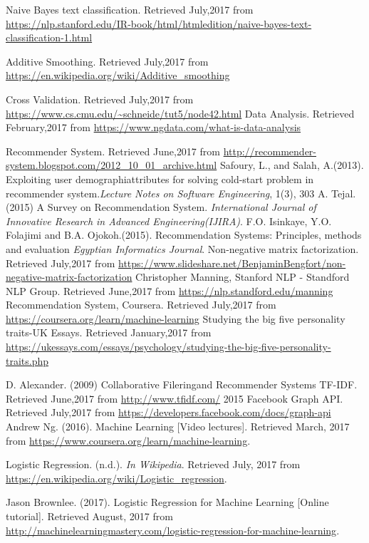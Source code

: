 \begin{thebibliography}{9}
	Naive Bayes text classification. Retrieved July,2017 from \url{https://nlp.stanford.edu/IR-book/html/htmledition/naive-bayes-text-classification-1.html}

	Additive Smoothing. Retrieved July,2017 from \url{https://en.wikipedia.org/wiki/Additive_smoothing}

Cross Validation. Retrieved July,2017 from \url{https://www.cs.cmu.edu/~schneide/tut5/node42.html}
Data Analysis. Retrieved February,2017 from \url{https://www.ngdata.com/what-is-data-analysis}

 Recommender System. Retrieved June,2017 from \url{http://recommender-system.blogspot.com/2012_10_01_archive.html}
	 Safoury, L., and Salah, A.(2013). Exploiting user demographiattributes for solving cold-start problem in recommender system.\textit{Lecture Notes on Software Engineering}, 1(3), 303
	A. Tejal.(2015) A Survey on Recommendation System. \textit{International Journal of Innovative Research in Advanced Engineering(IJIRA)}.
	F.O. Isinkaye, Y.O. Folajimi and B.A. Ojokoh.(2015). Recommendation Systems: Principles, methods and evaluation \textit{Egyptian Informatics Journal}.
	Non-negative matrix factorization. Retrieved July,2017 from \url{https://www.slideshare.net/BenjaminBengfort/non-negative-matrix-factorization}
Christopher Manning, Stanford NLP - Standford NLP Group. Retrieved June,2017 from \url{https://nlp.standford.edu/manning}
	Recommendation System, Coursera. Retrieved July,2017 from \url{https://coursera.org/learn/machine-learning}
Studying the big five personality traits-UK Essays. Retrieved January,2017 from \url{https://ukessays.com/essays/psychology/studying-the-big-five-personality-traits.php}

D. Alexander. (2009) Collaborative Fileringand Recommender Systems
TF-IDF. Retrieved June,2017 from \url{http://www.tfidf.com/} 2015
Facebook Graph API. Retrieved July,2017 from \url{https://developers.facebook.com/docs/graph-api}
  Andrew Ng. (2016). Machine Learning [Video lectures].
  Retrieved March, 2017 from \url{https://www.coursera.org/learn/machine-learning}.

  Logistic Regression. (n.d.). {\em In Wikipedia}. Retrieved July, 2017 from
  \url{https://en.wikipedia.org/wiki/Logistic_regression}.

  Jason Brownlee. (2017). Logistic Regression for Machine Learning [Online tutorial].
  Retrieved August, 2017 from
  \url{http://machinelearningmastery.com/logistic-regression-for-machine-learning}.

\end{thebibliography}
